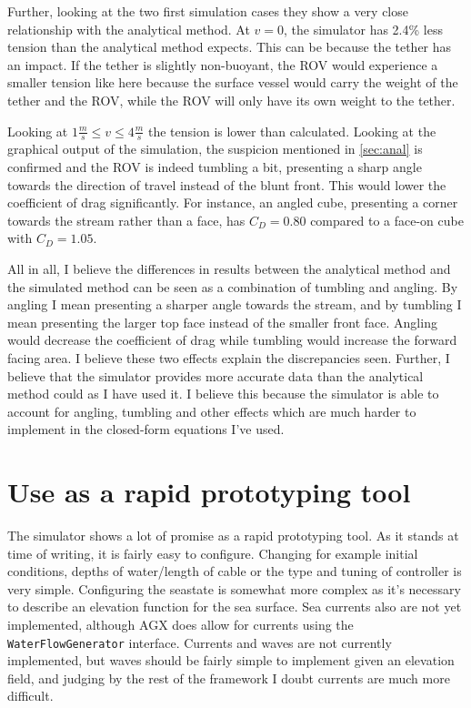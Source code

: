 Further, looking at the two first simulation cases they show a very close relationship with the analytical method. At \(v=0\), the simulator has 2.4\% less tension than the analytical method expects. This can be because the tether has an impact. If the tether is slightly non-buoyant, the ROV would experience a smaller tension like here because the surface vessel would carry the weight of the tether and the ROV, while the ROV will only have its own weight to the tether. 

Looking at \(1\frac{m}{s} \leq v \leq 4\frac m s\) the tension is lower than calculated. Looking at the graphical output of the simulation, the suspicion mentioned in \cref{sec:anal} is confirmed and the ROV is indeed tumbling a bit, presenting a sharp angle towards the direction of travel instead of the blunt front. This would lower the coefficient of drag significantly. For instance, an angled cube, presenting a corner towards the stream rather than a face, has \(C_D = 0.80\) compared to a face-on cube with \(C_D=1.05\). 

All in all, I believe the differences in results between the analytical method and the simulated method can be seen as a combination of tumbling and angling. By angling I mean presenting a sharper angle towards the stream, and by tumbling I mean presenting the larger top face instead of the smaller front face. Angling would decrease the coefficient of drag while tumbling would increase the forward facing area. I believe these two effects explain the discrepancies seen. Further, I believe that the simulator provides more accurate data than the analytical method could as I have used it. I believe this because the simulator is able to account for angling, tumbling and other effects which are much harder to implement in the closed-form equations I've used. 

\section{Use as a rapid prototyping tool}
The simulator shows a lot of promise as a rapid prototyping tool. As it stands at time of writing, it is fairly easy to configure. Changing for example initial conditions, depths of water/length of cable or the type and tuning of controller is very simple. Configuring the seastate is somewhat more complex as it's necessary to describe an elevation function for the sea surface. Sea currents also are not yet implemented, although AGX does allow for currents using the \texttt{WaterFlowGenerator} interface. Currents and waves are not currently implemented, but waves should be fairly simple to implement given an elevation field, and judging by the rest of the framework I doubt currents are much more difficult. 

